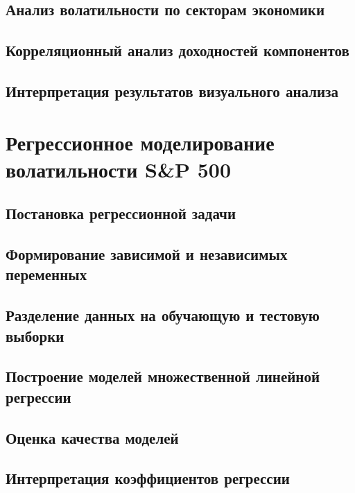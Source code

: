 \documentclass[12pt]{article}
\begin{document}
\subsection{Анализ волатильности по секторам экономики}

\subsection{Корреляционный анализ доходностей компонентов}

\subsection{Интерпретация результатов визуального анализа}

\newpage

\section{Регрессионное моделирование волатильности S\&P 500}

\subsection{Постановка регрессионной задачи}

\subsection{Формирование зависимой и независимых переменных}

\subsection{Разделение данных на обучающую и тестовую выборки}

\subsection{Построение моделей множественной линейной регрессии}

\subsection{Оценка качества моделей}

\subsection{Интерпретация коэффициентов регрессии}
\end{document}

